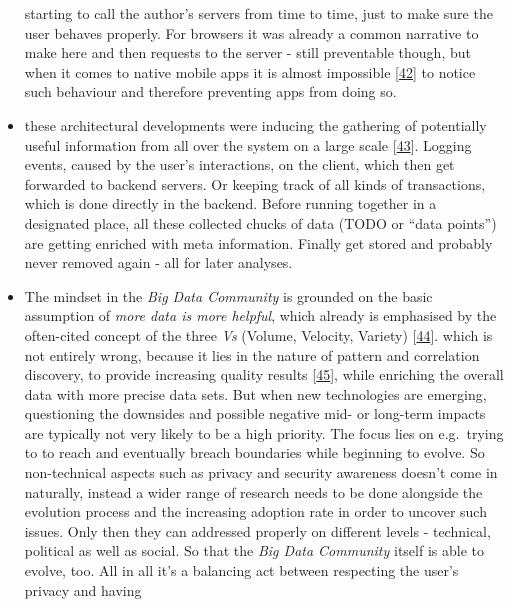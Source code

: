 \documentclass[12pt,english,a4paper,titlepage,cleardoublepage=empty,dottedtoc]{report}
\begin{document}
\begin{itemize}
  starting to call the author's servers from time to time, just to make
  sure the user behaves properly. For browsers it was already a common
  narrative to make here and then requests to the server - still
  preventable though, but when it comes to native mobile apps it is
  almost impossible
  {[}\protect\hyperlink{ref-web_2016_answers-io}{42}{]} to notice such
  behaviour and therefore preventing apps from doing so.
\item
  these architectural developments were inducing the gathering of
  potentially useful information from all over the system on a large
  scale
  {[}\protect\hyperlink{ref-web_2016_big-data-enthusiasts-should-not-ignore}{43}{]}.
  Logging events, caused by the user's interactions, on the client,
  which then get forwarded to backend servers. Or keeping track of all
  kinds of transactions, which is done directly in the backend. Before
  running together in a designated place, all these collected chucks of
  data (TODO or ``data points'') are getting enriched with meta
  information. Finally get stored and probably never removed again - all
  for later analyses.
\item
  The mindset in the \emph{Big Data Community} is grounded on the basic
  assumption of \emph{more data is more helpful}, which already is
  emphasised by the often-cited concept of the three \emph{Vs} (Volume,
  Velocity, Variety)
  {[}\protect\hyperlink{ref-report_2001_3d-data-management-controlling-data-volume-velocity-and-variety}{44}{]}.
  which is not entirely wrong, because it lies in the nature of pattern
  and correlation discovery, to provide increasing quality results
  {[}\protect\hyperlink{ref-paper_2015_big-data-for-development-a-review-of-promises-and-challenges:more-data}{45}{]},
  while enriching the overall data with more precise data sets. But when
  new technologies are emerging, questioning the downsides and possible
  negative mid- or long-term impacts are typically not very likely to be
  a high priority. The focus lies on e.g.~trying to to reach and
  eventually breach boundaries while beginning to evolve. So
  non-technical aspects such as privacy and security awareness doesn't
  come in naturally, instead a wider range of research needs to be done
  alongside the evolution process and the increasing adoption rate in
  order to uncover such issues. Only then they can addressed properly on
  different levels - technical, political as well as social. So that the
  \emph{Big Data Community} itself is able to evolve, too. All in all
  it's a balancing act between respecting the user's privacy and having

\end{itemize}
\end{document}
